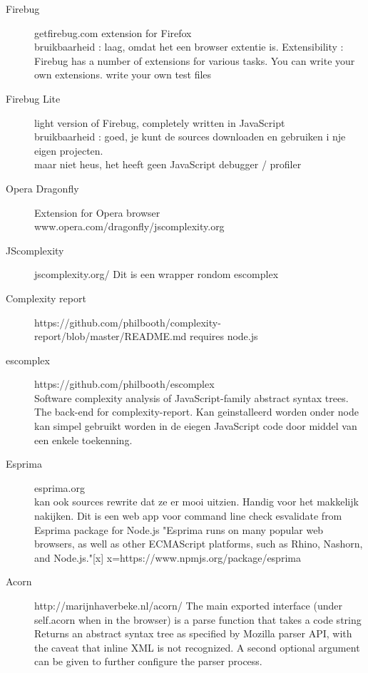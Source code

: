 \documentclass{article}
\begin{document}
\begin{description}
\item[Firebug]getfirebug.com
extension for Firefox\\
bruikbaarheid : laag, omdat het een browser extentie is.
Extensibility : Firebug has a number of extensions for various tasks. You can write your own extensions.
write your own test files

\item [Firebug Lite]light version of Firebug, completely written in JavaScript\\
bruikbaarheid : goed, je kunt de sources downloaden en gebruiken i nje eigen projecten.\\
maar niet heus, het heeft geen JavaScript debugger / profiler

\item[Opera Dragonfly]Extension for Opera browser\\
www.opera.com/dragonfly/jscomplexity.org

\item[JScomplexity]jscomplexity.org/
Dit is een wrapper rondom escomplex

\item[Complexity report]https://github.com/philbooth/complexity-report/blob/master/README.md   requires node.js

\item[escomplex]https://github.com/philbooth/escomplex\\
Software complexity analysis of JavaScript-family abstract syntax trees. The back-end for complexity-report.
Kan geinstalleerd worden onder node\\
kan simpel gebruikt worden in de eiegen JavaScript code door middel van een enkele toekenning.\\

\item[Esprima]esprima.org\\
kan ook sources rewrite dat ze er mooi uitzien. Handig voor het makkelijk nakijken.
Dit is een web app
voor command line check esvalidate from Esprima package for Node.js
"Esprima runs on many popular web browsers, as well as other ECMAScript platforms, such as Rhino, Nashorn, and Node.js."[x]
x=https://www.npmjs.org/package/esprima

\item[Acorn]http://marijnhaverbeke.nl/acorn/
The main exported interface (under self.acorn when in the browser) is a parse function that takes a code string\\
Returns an abstract syntax tree as specified by Mozilla parser API, with the caveat that inline XML is not recognized.
A second optional argument can be given to further configure the parser process.


\end{description}
\end{document}
